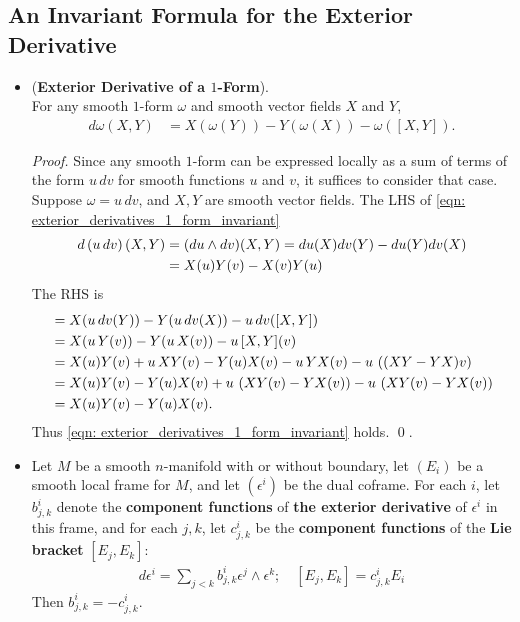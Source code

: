 \documentclass[11pt]{article}
\begin{document}
\subsection{An Invariant Formula for the Exterior Derivative}
\begin{itemize}
\item \begin{proposition} (\textbf{Exterior Derivative of a $1$-Form}). \\
For any smooth $1$-form $\omega$ and smooth vector fields $X$ and $Y$,
\begin{align}
d\omega(X,Y) &= X(\omega(Y)) - Y(\omega(X)) - \omega([X, Y]).\label{eqn: exterior_derivatives_1_form_invariant}
\end{align}
\end{proposition}
\begin{proof}
Since any smooth $1$-form can be expressed locally as a sum of terms of the form $u\,dv$ for smooth functions $u$ and $v$, it suffices to consider that case.  Suppose
$\omega = u\,dv$, and $X, Y$ are smooth vector fields. The LHS of \eqref{eqn: exterior_derivatives_1_form_invariant}
\begin{align*}
d\left(u\, dv\right)(X, Y) &= (du \wedge dv)(X, Y) = du(X)dv(Y) - du(Y)dv(X) \\
&= X(u) Y(v) - X(v) Y(u)
\end{align*}
The RHS is
\begin{align*}
&=X(u\, dv(Y)) - Y(u\, dv(X)) -u\, dv([X, Y]) \\
&= X(u\, Y(v)) - Y(u\,X(v)) - u\,[X,Y](v)\\
&= X(u) Y(v) + u\,XY(v) - Y(u)X(v) - u\,YX(v) - u\,\left((XY- YX)v\right)\\
&= X(u) Y(v) - Y(u)X(v) + u\,\left(XY(v) - YX(v)\right) - u\,\left(XY(v) - YX(v)\right)\\
&= X(u) Y(v) - Y(u)X(v).
\end{align*} Thus \eqref{eqn: exterior_derivatives_1_form_invariant} holds. \qed.
\end{proof}

\item \begin{proposition}
Let $M$ be a smooth $n$-manifold with or without boundary, let $(E_i)$ be a smooth local frame for $M$, and let $(\epsilon^i)$ be the dual coframe. For each $i$,
let $b^{i}_{j,k}$ denote the \textbf{component functions} of \textbf{the exterior derivative} of $\epsilon^i$ in this frame, and for each $j,k$, let $c^{i}_{j,k}$ be the \textbf{component functions} of the \textbf{Lie bracket} $[E_j, E_k]$:
\begin{align*}
d\epsilon^i =\sum_{j < k} b^{i}_{j,k}\epsilon^{j} \wedge \epsilon^{k}; \quad [E_j, E_k] = c^{i}_{j,k} E_i
\end{align*} Then $b^{i}_{j,k}= - c^{i}_{j,k}$. 
\end{proposition}


\end{itemize}
\end{document}

